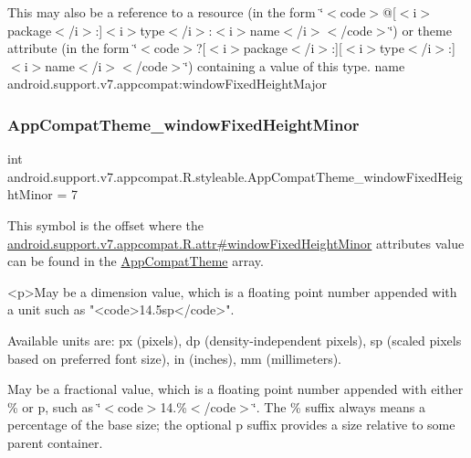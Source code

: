 This may also be a reference to a resource (in the form \char`\"{}$<$code$>$@\mbox{[}$<$i$>$package$<$/i$>$\+:\mbox{]}$<$i$>$type$<$/i$>$\+:$<$i$>$name$<$/i$>$$<$/code$>$\char`\"{}) or theme attribute (in the form \char`\"{}$<$code$>$?\mbox{[}$<$i$>$package$<$/i$>$\+:\mbox{]}\mbox{[}$<$i$>$type$<$/i$>$\+:\mbox{]}$<$i$>$name$<$/i$>$$<$/code$>$\char`\"{}) containing a value of this type.  name android.\+support.\+v7.\+appcompat\+:window\+Fixed\+Height\+Major \mbox{\label{classandroid_1_1support_1_1v7_1_1appcompat_1_1R_1_1styleable_a5ea54cdfaf428b78c942f5de400a165f}} 
\subsubsection{\texorpdfstring{App\+Compat\+Theme\+\_\+window\+Fixed\+Height\+Minor}{AppCompatTheme\_windowFixedHeightMinor}}
{\footnotesize\ttfamily int android.\+support.\+v7.\+appcompat.\+R.\+styleable.\+App\+Compat\+Theme\+\_\+window\+Fixed\+Height\+Minor = 7\hspace{0.3cm}{\ttfamily [static]}}

This symbol is the offset where the \hyperlink{classandroid_1_1support_1_1v7_1_1appcompat_1_1R_1_1attr_a878de167a65f79db62c6640c6e39022d}{android.\+support.\+v7.\+appcompat.\+R.\+attr\#window\+Fixed\+Height\+Minor} attribute\textquotesingle{}s value can be found in the \hyperlink{classandroid_1_1support_1_1v7_1_1appcompat_1_1R_1_1styleable_a5c42f89e8a410c323be34208d75c430b}{App\+Compat\+Theme} array.

\begin{DoxyVerb}      <p>May be a dimension value, which is a floating point number appended with a unit such as "<code>14.5sp</code>".
\end{DoxyVerb}
 Available units are\+: px (pixels), dp (density-\/independent pixels), sp (scaled pixels based on preferred font size), in (inches), mm (millimeters). 

May be a fractional value, which is a floating point number appended with either \% or p, such as \char`\"{}$<$code$>$14.\%$<$/code$>$\char`\"{}. The \% suffix always means a percentage of the base size; the optional p suffix provides a size relative to some parent container. 

